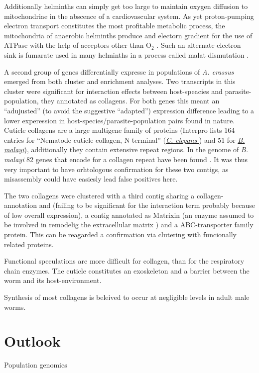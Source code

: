 Additionally helminths can simply get too large to maintain oxygen
diffusion to mitochondriae in the abscence of a cardiovascular
system. As yet proton-pumping electron transport constitutes the most
profitable metabolic process, the mitochondria of anaerobic helminths
produce and electorn gradient for the use of ATPase with the help of
acceptors other than O$_2$ \cite{pmid12417132}. Such an alternate
electron sink is fumarate used in many helminths in a process called
malat dismutation \cite{pmid15275412}.

A second group of genes differentially expresse in populations of
\textit{A. crassus} emerged from both cluster and enrichment
analyses. Two transcripts in this cluster were significant for
interaction effects between host-speacies and parasite-population,
they annotated as collagens. For both genes this meant an
``adujusted'' (to avoid the suggestive ``adapted'') expression
difference leading to a lower experession in
host-species/parasite-population pairs found in nature. Cuticle
collagens are a large multigene family of proteins (Interpro lists 164
entries for ``Nematode cuticle collagen, N-terminal''
(\href{http://www.ebi.ac.uk/interpro/ISpy?ipr=IPR002486&tax=6239}{\textit{C. elegans}
}) and 51 for
\href{http://www.ebi.ac.uk/interpro/ISpy?ipr=IPR002486&tax=6279}{\textit{B. malayi}}),
additionally they contain extensive repeat regions. In the genome of
\textit{B. malayi} 82 genes that encode for a collagen repeat have
been found \cite{ghedin_draft_2007}. It was thus very important to
have orhtologous confirmation for these two contigs, as misassembly
could have easiesly lead false positives here.

The two collagens were clustered with a third contig sharing a
collagen-annotation and (failing to be significant for the interaction
term probably because of low overall expression), a contig annotated
as Matrixin (an enzyme assumed to be involved in remodelig the
extracellular matrix \cite{mealloprot}) and a ABC-transporter family
protein. This can be reagarded a confirmation via clutering with
funcionally related proteins.

Functional speculations are more difficult for collagen, than for the
respiratory chain enzymes. The cuticle constitutes an exoskeleton and
a barrier between the worm and its host-environment.

Synthesis of most collagens is beleived to occur at negligible levels
in adult male worms. 


\section{Outlook}

Population genomics


